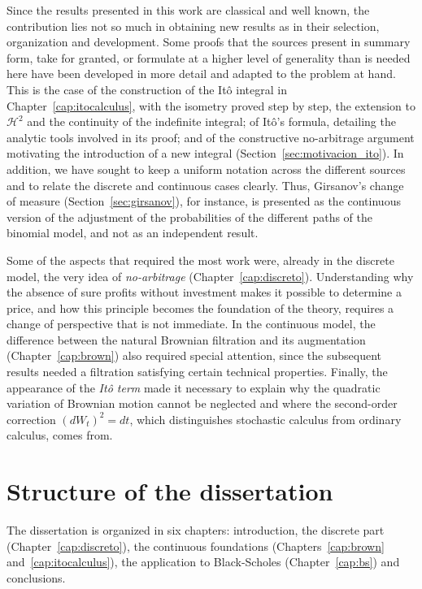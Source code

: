 \documentclass[11pt,a4paper,oneside]{report}
\theoremstyle{plain}
\theoremstyle{definition}
\theoremstyle{remark}
\newcommand{\1}{\mathbf{1}}
\begin{document}
Since the results presented in this work are classical and well
known, the contribution lies not so much in obtaining new results as
in their selection, organization and development. Some proofs that
the sources present in summary form, take for granted, or formulate
at a higher level of generality than is needed here have been
developed in more detail and adapted to the problem at hand. This is
the case of the construction of the Itô integral in
Chapter~\ref{cap:itocalculus}, with the isometry proved step by step,
the extension to $\mathcal{H}^2$ and the continuity of the indefinite
integral; of Itô's formula, detailing the analytic tools involved in
its proof; and of the constructive no-arbitrage argument motivating
the introduction of a new integral
(Section~\ref{sec:motivacion_ito}). In addition, we have sought to
keep a uniform notation across the different sources and to relate
the discrete and continuous cases clearly. Thus, Girsanov's change of
measure (Section~\ref{sec:girsanov}), for instance, is presented as
the continuous version of the adjustment of the probabilities of the
different paths of the binomial model, and not as an independent
result.

Some of the aspects that required the most work were, already in the
discrete model, the very idea of \emph{no-arbitrage}
(Chapter~\ref{cap:discreto}). Understanding why the absence of sure
profits without investment makes it possible to determine a price,
and how this principle becomes the foundation of the theory, requires
a change of perspective that is not immediate. In the continuous
model, the difference between the natural Brownian filtration and its
augmentation (Chapter~\ref{cap:brown}) also required special
attention, since the subsequent results needed a filtration
satisfying certain technical properties. Finally, the appearance of
the \emph{Itô term} made it necessary to explain why the quadratic
variation of Brownian motion cannot be neglected and where the
second-order correction $(dW_t)^2 = dt$, which distinguishes
stochastic calculus from ordinary calculus, comes from.

\section{Structure of the dissertation}
\label{sec:estructura}

The dissertation is organized in six chapters: introduction, the
discrete part (Chapter~\ref{cap:discreto}), the continuous
foundations (Chapters~\ref{cap:brown} and~\ref{cap:itocalculus}), the
application to Black-Scholes (Chapter~\ref{cap:bs}) and conclusions.
\end{document}
